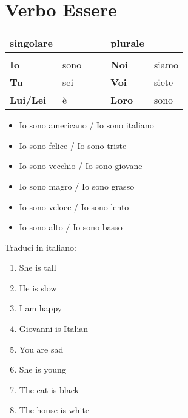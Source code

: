 \documentclass[letter,11pt]{article}
\newcommand{\myCode}[1]{\colorbox{gray!30}{#1}}
\begin{document}
\vskip 0.5in
\section*{Verbo Essere}
\vskip 0.2in

\begin{tabular}{ |p{2cm}| p{2cm}| p{0.2cm}| p{0.2cm}| p{2cm}| p{2cm}| }
     singolare &  &  &  & plurale &  \\
    \hline
    \hline
     &  &  &  &  &  \\ \hline
    {\bf Io} & sono   &  & & {\bf Noi}  & siamo \\ \hline
    {\bf Tu} & sei    &  & & {\bf Voi}  & siete \\ \hline
    {\bf Lui/Lei} & è &  & & {\bf Loro} & sono  \\ \hline
    \hline
    \end{tabular}

\vskip 0.5in
\begin{multicols}{2}
\begin{itemize}
    \item Io sono americano / Io sono italiano
    \item Io sono felice / Io sono triste
    \item Io sono vecchio / Io sono giovane
    \item Io sono magro / Io sono grasso
    \item Io sono veloce / Io sono lento
    \item Io sono alto / Io sono basso
\end{itemize}
\end{multicols}

\vskip 0.1in
\myCode{Traduci in italiano: }

\begin{multicols}{2}
\begin{enumerate}
    \item She is tall
    \item He is slow
    \item I am happy
    \item Giovanni is Italian
    \item You are sad
    \item She is young
    \item The cat is black
    \item The house is white
\end{enumerate}
\end{multicols}

\vskip 0.2in
\end{document}

